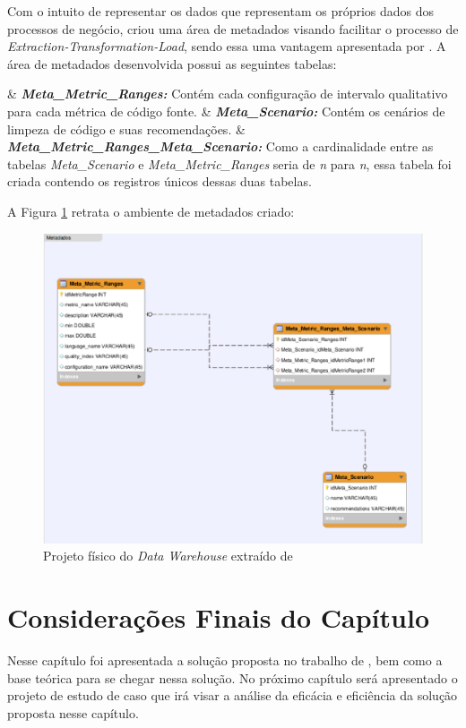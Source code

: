 Com o intuito de representar os dados que representam os próprios dados dos processos de negócio,  criou uma área de metadados visando facilitar o processo de \textit{Extraction-Transformation-Load}, sendo essa uma vantagem apresentada por \cite{Kimball2002}. A área de metadados desenvolvida possui as seguintes tabelas:

\begin{easylist}[itemize]

	& \textbf{\textit{Meta\_Metric\_Ranges:}} Contém cada configuração de intervalo qualitativo para cada métrica de código fonte.
	& \textbf{\textit{Meta\_Scenario:}} Contém os cenários de limpeza de código e suas recomendações.
	& \textbf{\textit{Meta\_Metric\_Ranges\_Meta\_Scenario:}} Como a cardinalidade entre as tabelas \textit{Meta\_Scenario} e \textit{Meta\_Metric\_Ranges} seria de \textit{n} para \textit{n}, essa tabela foi criada contendo os registros únicos dessas duas tabelas.
	
	\end{easylist}

A Figura \ref{fig:metadados} retrata o ambiente de metadados criado:

\begin{figure}[h!]
\centering
\includegraphics[keepaspectratio=false,scale=0.6]{figuras/figuras_matheus/metadados-baufaker.eps}
\caption{Projeto físico do \textit{Data Warehouse} extraído de }
\label{fig:metadados}
\end{figure}
\FloatBarrier



\section{Considerações Finais do Capítulo}

Nesse capítulo foi apresentada a solução proposta no trabalho de , bem como a base teórica para se chegar nessa solução. No próximo capítulo será apresentado o projeto de estudo de caso que irá visar a análise da eficácia e eficiência da solução proposta nesse capítulo.
